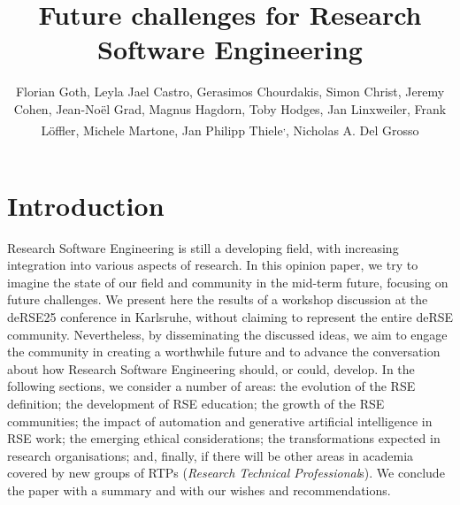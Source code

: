 \documentclass{eceasst}
\title{Future challenges for Research Software Engineering} %
\author{
Florian Goth\authorRef{1},
Leyla Jael Castro\authorRef{2},
Gerasimos Chourdakis\authorRef{3},
Simon Christ\authorRef{4},
Jeremy Cohen\authorRef{5},
Jean-Noël Grad\authorRef{6},
Magnus Hagdorn\authorRef{7},
Toby Hodges\authorRef{8},
Jan Linxweiler\authorRef{9},
Frank Löffler\authorRef{10},
Michele Martone\authorRef{11},
Jan Philipp Thiele\authorRef{9}\textsuperscript{,}\authorRef{12},
Nicholas A. Del Grosso\authorRef{13}
} %
\institute{%
\autlabel{1} Institut für theoretische Physik 1, University of Würzburg, 97074, Würzburg, Germany\par
\autlabel{2} ZB MED Information Centre for Life Sciences, Cologne, Germany\par
\autlabel{3} Institute for Parallel and Distributed Systems, University of Stuttgart, Stuttgart, Germany\par
\autlabel{4} Leibniz University Hannover, Department of Cell Biology and Biophysics, Computational Biology, Germany\par
\autlabel{5} Imperial College London, London, UK\par
\autlabel{6} Institute for Computational Physics, University of Stuttgart, Germany\par
\autlabel{7} Geschäftsbereich IT, Charité Universitätsmedizin Berlin, Germany\par
\autlabel{8} The Carpentries, USA\par
\autlabel{9} Technische Universität Braunschweig, Germany\par
\autlabel{10} Michael Stifel Center Jena {\&} Friedrich Schiller University Jena, Germany\par
\autlabel{11} Leibniz Supercomputing Centre, Garching, Germany\par
\autlabel{12} Weierstrass Institute, Berlin, Germany;
              Leibniz University Hannover, Institute of Applied Mathematics, Scientific Computing, Hannover, Germany\par
\autlabel{13} Institute for Experimental Epileptology and Cognition Research, Uniklinikum Bonn, Germany
}
\begin{document}
\maketitle

\section{Introduction}

Research Software Engineering is still a developing field,
with increasing integration into various aspects of research.
In this opinion paper, we try to imagine the state of our field
and community in the mid-term future, focusing on future challenges.
We present here the results of a workshop discussion at the
deRSE25 conference in Karlsruhe\cite{Goth2025EndRSEng}, without
claiming to represent the entire deRSE community.
Nevertheless, by disseminating the discussed ideas,
we aim to engage the community in creating a worthwhile future
and to advance the conversation about how Research Software Engineering should, or could, develop.
In the following sections, we consider a number of areas:
the evolution of the RSE definition;
the development of RSE education;
the growth of the RSE communities;
the impact of automation and generative artificial intelligence in RSE work;
the emerging ethical considerations;
the transformations expected in research organisations;
and, finally, if there will be other areas in academia covered by new groups of RTPs (\emph{Research Technical Professional}s).
We conclude the paper with a summary and with our wishes and recommendations.
\end{document}
